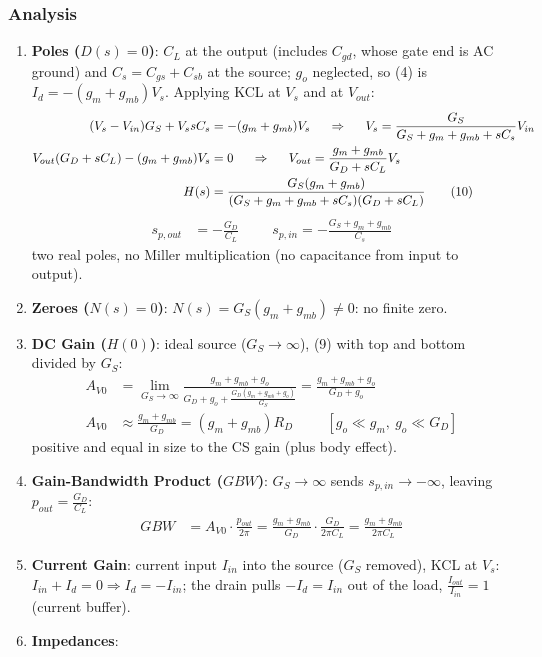 \subsubsection{Analysis}
\begin{enumerate}
  \item \textbf{Poles (\(D(s) = 0\))}: \(C_L\) at the output (includes \(C_{gd}\), whose gate end is
    AC ground) and \(C_s = C_{gs} + C_{sb}\) at the source; \(g_o\) neglected, so (4) is
    \(I_d = -(g_m + g_{mb}) V_s\). Applying KCL at \(V_s\) and at \(V_{out}\):
    \begin{align*}
      (V_s - V_{in}) G_S + V_s sC_s &= -(g_m + g_{mb}) V_s
      \hspace{0.5cm} \Rightarrow \hspace{0.5cm}
      V_s = \frac{G_S}{G_S + g_m + g_{mb} + sC_s} V_{in} \\
      V_{out}(G_D + sC_L) - (g_m + g_{mb}) V_s &= 0
      \hspace{0.5cm} \Rightarrow \hspace{0.5cm}
      V_{out} = \frac{g_m + g_{mb}}{G_D + sC_L} V_s \\
      H(s) &= \frac{G_S (g_m + g_{mb})}{(G_S + g_m + g_{mb} + sC_s)(G_D + sC_L)} \tag{10}
    \end{align*}
    \begin{align*}
      s_{p,out} &= -\frac{G_D}{C_L} \hspace{1cm} s_{p,in} = -\frac{G_S + g_m + g_{mb}}{C_s}
    \end{align*}
    two real poles, no Miller multiplication (no capacitance from input to output).
  \item \textbf{Zeroes (\(N(s) = 0\))}: \(N(s) = G_S (g_m + g_{mb}) \neq 0\): no finite zero.
  \item \textbf{DC Gain (\(H(0)\))}: ideal source (\(G_S \to \infty\)), (9) with top and bottom
    divided by \(G_S\):
    \begin{align*}
      A_{V0} &= \lim_{G_S \to \infty} \frac{g_m + g_{mb} + g_o}{G_D + g_o + \frac{G_D (g_m + g_{mb} + g_o)}{G_S}}
              = \frac{g_m + g_{mb} + g_o}{G_D + g_o} \\
      A_{V0} &\approx \frac{g_m + g_{mb}}{G_D} = (g_m + g_{mb}) R_D \hspace{1cm} [g_o \ll g_m,\ g_o \ll G_D]
    \end{align*}
    positive and equal in size to the CS gain (plus body effect).
  \item \textbf{Gain-Bandwidth Product (\(GBW\))}: \(G_S \to \infty\) sends \(s_{p,in} \to -\infty\),
    leaving \(p_{out} = \frac{G_D}{C_L}\):
    \begin{align*}
      GBW &= A_{V0} \cdot \frac{p_{out}}{2\pi} = \frac{g_m + g_{mb}}{G_D}\cdot\frac{G_D}{2\pi C_L} = \frac{g_m + g_{mb}}{2\pi C_L}
    \end{align*}
  \item \textbf{Current Gain}: current input \(I_{in}\) into the source (\(G_S\) removed), KCL
    at \(V_s\): \(I_{in} + I_d = 0 \Rightarrow I_d = -I_{in}\); the drain pulls \(-I_d = I_{in}\) out of
    the load, \(\frac{I_{out}}{I_{in}} = 1\) (current buffer).
  \item \textbf{Impedances}:

\end{enumerate}

